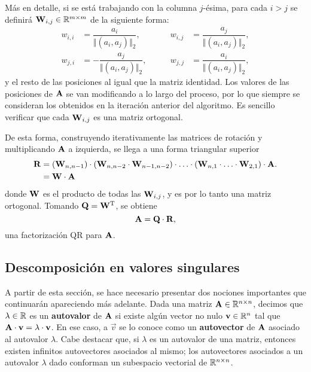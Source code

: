 Más en detalle, si se está trabajando con la columna $j$-ésima, para cada
$i>j$ se definirá $\mathbf{W}_{i,j} \in \mathbb{R}^{m \times m}$
de la siguiente forma:
\[ \begin{aligned}
    w_{i,i} &= \dfrac{a_i}{\Vert (a_{i}, a_{j}) \Vert_2}, \qquad&
    w_{i,j} &= \dfrac{a_j}{\Vert (a_{i}, a_{j}) \Vert_2}, \\
    w_{j,i} &= - \dfrac{a_j}{\Vert (a_{i}, a_{j}) \Vert_2}, \qquad&
    w_{j,j} &= \dfrac{a_i}{\Vert (a_{i}, a_{j}) \Vert_2},
\end{aligned} \]
y el resto de las posiciones al igual que la matriz identidad. Los valores de
las posiciones de $\mathbf{A}$ se van modificando a lo largo del proceso, por lo
que siempre se consideran los obtenidos en la iteración anterior del
algoritmo. Es sencillo verificar que cada $\mathbf{W}_{i,j}$ es una
matriz ortogonal.

De esta forma, construyendo iterativamente las matrices de rotación y
multiplicando $\mathbf{A}$ a izquierda, se llega a una forma triangular superior
\[ \begin{aligned}
    \mathbf{R} &= (\mathbf{W}_{n,n-1})
        \cdot (\mathbf{W}_{n,n-2} \cdot \mathbf{W}_{n-1,n-2})
        \cdot \ldots
        \cdot (\mathbf{W}_{n,1} \cdot \ldots \cdot \mathbf{W}_{2,1}) \cdot \mathbf{A}. \\
    &= \mathbf{W} \cdot \mathbf{A}
\end{aligned} \]
donde $\mathbf{W}$ es el producto de todas las $\mathbf{W}_{i,j}$, y es por lo tanto
una matriz ortogonal. Tomando $\mathbf{Q} = \mathbf{W}^{\mathrm{T}}$, se obtiene
\[ \mathbf{A} = \mathbf{Q} \cdot \mathbf{R}, \]
una factorización QR para $\mathbf{A}$.

\subsection{Descomposición en valores singulares}

A partir de esta sección, se hace necesario presentar dos nociones importantes
que continuarán apareciendo más adelante.
Dada una matriz $\mathbf{A} \in \mathbb{R}^{n \times n}$, decimos que $\lambda \in
\mathbb{R}$ es un \textbf{autovalor} de $\mathbf{A}$ si existe algún vector no nulo
$\mathbf{v} \in \mathbb{R}^n$ tal que $\mathbf{A} \cdot \mathbf{v} = \lambda \cdot \mathbf{v}$.
En ese caso, a $\vec{v}$ se lo conoce como un \textbf{autovector} de $\mathbf{A}$
asociado al autovalor $\lambda$. Cabe destacar que, si $\lambda$ es un
autovalor de una matriz, entonces existen infinitos autovectores asociados al
mismo; los autovectores asociados a un autovalor $\lambda$ dado conforman un
subespacio vectorial de $\mathbb{R}^{n \times n}$.

